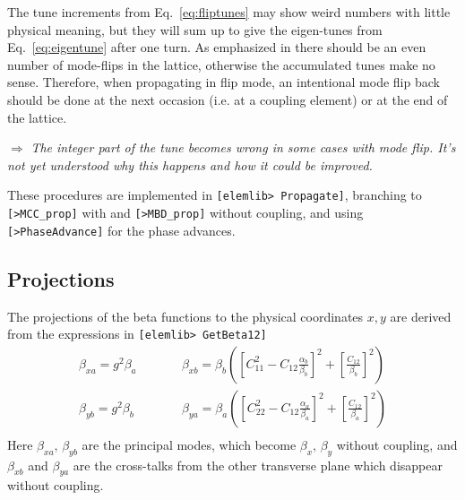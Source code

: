 \documentclass[12pt]{article}
\newcommand\todo[1]{$\Longrightarrow$ {\em #1} }
\newcommand\code[1]{{\tt [#1]}}
\begin{document}
The tune increments from Eq.~\ref{eq:fliptunes} may show weird numbers with little physical meaning, but they will sum up to give the eigen-tunes from Eq.~\ref{eq:eigentune} after one turn.
As emphasized in \cite{SAGAN} there should be an even number of mode-flips in the lattice, otherwise the accumulated tunes make no sense.
Therefore, when propagating in flip mode, an intentional mode flip back should be done at the next occasion (i.e. at a coupling element) or at the end of the lattice.

\todo{The integer part of the tune becomes wrong in some cases with mode flip. It's not yet understood why this happens and how it could be improved.}

These procedures are implemented in \code{elemlib> Propagate}, branching to \code{>MCC\_prop} with and  \code{>MBD\_prop} without coupling, and using \code{>PhaseAdvance} for the phase advances.


\subsection{Projections}
The projections of the beta functions to the physical coordinates $x,y$ are derived from the expressions in \cite{SAGAN} \code{elemlib> GetBeta12}
\begin{eqnarray}
\beta_{xa}=g^2 \beta_a & \qquad &
\beta_{xb} = \beta_b \left( \left[ C_{11}^2-C_{12}\frac{\alpha_b}{\beta_b} \right]^2 + \left[ \frac{C_{12}}{\beta_b}\right]^2\right) \\
\beta_{yb}=g^2 \beta_b & \qquad &
\beta_{ya} = \beta_a \left( \left[ C_{22}^2-C_{12}\frac{\alpha_a}{\beta_a} \right]^2 + \left[ \frac{C_{12}}{\beta_a}\right]^2\right) \\
\end{eqnarray}
Here $\beta_{xa},\, \beta_{yb}$ are the principal modes, which become $\beta_x,\, \beta_y$ without coupling, and $\beta_{xb}$ and $\beta_{ya}$ are the cross-talks from the other transverse plane which disappear without coupling.\\
\end{document}
